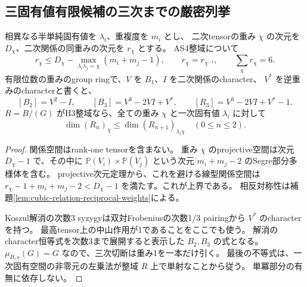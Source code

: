 \subsection{三固有値有限候補の三次までの厳密列挙}
\label{subsec:cubic-three-eigenvalue-finite-list}
\begin{lemma}[関係重みの整域上界と三次character]
\label{lem:cubic-finite-spectrum-character-bounds}
相異なる半単純固有値を $\lambda_i$、重複度を $m_i$ とし、
二次tensorの重み $\chi$ の次元を $D_\chi$、二次関係の同重みの次元を $r_\chi$ とする。
AS4整域について
\[
 r_\chi\le D_\chi-\max_{\lambda_i\lambda_j=\chi}(m_i+m_j-1),
 \qquad r_\chi=r_{\chi^{-1}},\qquad\sum_\chi r_\chi=6.
\]
有限位数の重みのgroup ringで、$V$ を $B_1$、$I$ を二次関係のcharacter、
$V^*$ を逆重みのcharacterと書くと、
\[
 [B_2]=V^2-I,\qquad [B_3]=V^3-2VI+V^*,\qquad
 [R_3]=V^3-2VI+V^*-1.
\]
$R=B/(G)$ がH3整域なら、全ての重み $\chi$ と一次固有値 $\lambda_i$ に対して
\[
 \dim(R_n)_\chi\le\dim(R_{n+1})_{\lambda_i\chi}\quad(0\le n\le2).
\]
\end{lemma}
\begin{proof}
関係空間はrank-one tensorを含まない。
重み $\chi$ のprojective空間は次元 $D_\chi-1$ で、その中に
$\mathbb P(V_i)\times\mathbb P(V_j)$ という次元 $m_i+m_j-2$ のSegre部分多様体を含む。
projective次元定理から、これを避ける線型関係空間は
$r_\chi-1+m_i+m_j-2<D_\chi-1$ を満たす。これが上界である。
相反対称性は補題\ref{lem:cubic-relation-reciprocal-weights}による。

Koszul解消の次数3 syzygyは双対Frobeniusの次数1/3 pairingから $V^*$ のcharacterを持つ。
最高tensor上の中山作用が1であることをここでも使う。
解消のcharacter恒等式を次数3まで展開すると表示した $B_2,B_3$ の式となる。
$\mu_{B,s}(G)=G$ なので、三次切断は重み1を一本だけ引く。
最後の不等式は、一次固有空間の非零元の左乗法が整域 $R$ 上で単射なことから従う。
単冪部分の有無に依存しない。
\end{proof}

